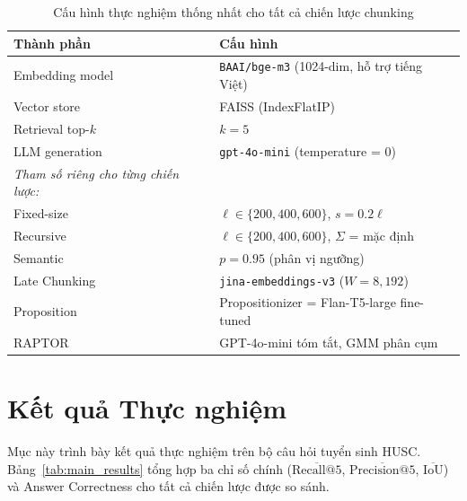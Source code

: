 \documentclass[12pt,a4paper]{report}
\theoremstyle{plain}
\theoremstyle{definition}
\begin{document}
	\begin{table}[htbp]
		\centering
		\caption{Cấu hình thực nghiệm thống nhất cho tất cả chiến lược chunking}
		\label{tab:exp_config}
		\begin{tabular}{ll}
			\toprule
			\textbf{Thành phần} & \textbf{Cấu hình} \\
			\midrule
			Embedding model & \texttt{BAAI/bge-m3} (1024-dim, hỗ trợ tiếng Việt) \\
			Vector store    & FAISS (IndexFlatIP) \\
			Retrieval top-$k$ & $k = 5$ \\
			LLM generation  & \texttt{gpt-4o-mini} (temperature = 0) \\
			\midrule
			\textit{Tham số riêng cho từng chiến lược:} & \\
			Fixed-size      & $\ell \in \{200, 400, 600\}$, $s = 0.2\ell$ \\
			Recursive       & $\ell \in \{200, 400, 600\}$, $\Sigma$ = mặc định \\
			Semantic        & $p = 0.95$ (phân vị ngưỡng) \\
			Late Chunking   & \texttt{jina-embeddings-v3} ($W = 8{,}192$) \\
			Proposition     & Propositionizer = Flan-T5-large fine-tuned \\
			RAPTOR          & GPT-4o-mini tóm tắt, GMM phân cụm \\
			\bottomrule
		\end{tabular}
	\end{table}
	
	\section{Kết quả Thực nghiệm}
	\label{sec:results}
	
	Mục này trình bày kết quả thực nghiệm trên bộ câu hỏi tuyển sinh HUSC.
	Bảng~\ref{tab:main_results} tổng hợp ba chỉ số chính ($\overline{\text{Recall}@5}$,
	$\overline{\text{Precision}@5}$, $\overline{\text{IoU}}$) và Answer
	Correctness cho tất cả chiến lược được so sánh.
	
\end{document}
